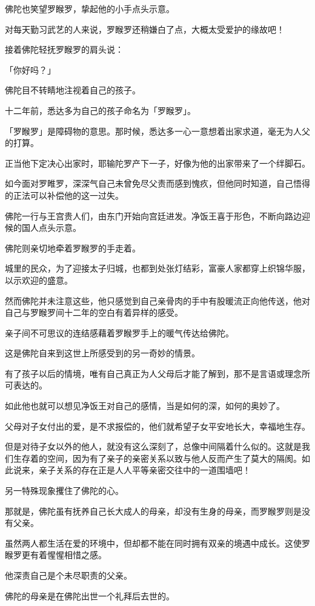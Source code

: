 \documentclass[twoside,openany]{book}
\begin{document}
佛陀也笑望罗睺罗，挚起他的小手点头示意。

对每天勤习武艺的人来说，罗睺罗还稍嫌白了点，大概太受爱护的缘故吧！

接着佛陀轻抚罗睺罗的肩头说：

「你好吗？」

佛陀目不转睛地注视着自己的孩子。

十二年前，悉达多为自己的孩子命名为「罗睺罗」。

「罗睺罗」是障碍物的意思。那时候，悉达多一心一意想着出家求道，毫无为人父的打算。

正当他下定决心出家时，耶输陀罗产下一子，好像为他的出家带来了一个绊脚石。

如今面对罗睢罗，深深气自己未曾免尽父责而感到愧疚，但他同时知道，自己悟得的正法可以补偿他的这一过失。

佛陀一行与王宫贵人们，由东门开始向宫廷进发。净饭王喜于形色，不断向路边迎候的国人点头示意。

佛陀则亲切地牵着罗睺罗的手走着。

城里的民众，为了迎接太子归城，也都到处张灯结彩，富豪人家都穿上织锦华服，以示欢迎的盛意。

然而佛陀并未注意这些，他只感觉到自己亲骨肉的手中有股暖流正向他传送，他对自己与罗睺罗间十二年的空白有着异样的感受。

亲子间不可思议的连结感藉着罗睺罗手上的暖气传达给佛陀。

这是佛陀自来到这世上所感受到的另一奇妙的情景。

有了孩子以后的情境，唯有自己真正为人父母后才能了解到，那不是言语或理念所可表达的。

如此他也就可以想见净饭王对自己的感情，当是如何的深，如何的奥妙了。

父母对子女付出的爱，是不求报偿的，他们就希望子女平安地长大，幸福地生存。

但是对待子女以外的他人，就没有这么深刻了，总像中间隔着什么似的。这就是我们生存着的空间，因为有了亲子的亲密关系以致与他人反而产生了莫大的隔阂。如此说来，亲子关系的存在正是人人平等亲密交往中的一道围墙吧！

另一特殊现象攫住了佛陀的心。

那就是，佛陀虽有抚养自己长大成人的母亲，却没有生身的母亲，而罗睺罗则是没有父亲。

虽然两人都生活在爱的环境中，但却都不能在同时拥有双亲的境遇中成长。这使罗睺罗更有着惺惺相惜之感。

他深责自己是个未尽职责的父亲。

佛陀的母亲是在佛陀出世一个礼拜后去世的。
\end{document}
